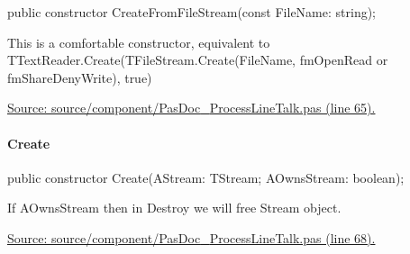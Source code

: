 \documentclass{report}
\newif\ifpdf
\begin{document}
\label{PasDoc_ProcessLineTalk.TTextReader-CreateFromFileStream}
\begin{list}{}{
\setlength{\itemindent}{0cm}
\setlength{\listparindent}{0cm}
\setlength{\leftmargin}{\evensidemargin}
\addtolength{\leftmargin}{\tmplength}
\settowidth{\labelsep}{X}
\addtolength{\leftmargin}{\labelsep}
\setlength{\labelwidth}{\tmplength}
}
\item[\textbf{Declaration}\hfill]
\ifpdf
\begin{flushleft}
\fi
\begin{ttfamily}
public constructor CreateFromFileStream(const FileName: string);\end{ttfamily}

\ifpdf
\end{flushleft}
\fi

\par
\item[\textbf{Description}]
This is a comfortable constructor, equivalent to TTextReader.Create(TFileStream.Create(FileName, fmOpenRead or fmShareDenyWrite), true)\par
\href{https://github.com/pasdoc/pasdoc/blob/master/source/component/PasDoc_ProcessLineTalk.pas#L65}{Source: source/component/PasDoc{\_}ProcessLineTalk.pas (line 65).}

\end{list}
\paragraph*{Create}\hspace*{\fill}

\label{PasDoc_ProcessLineTalk.TTextReader-Create}
\begin{list}{}{
\setlength{\itemindent}{0cm}
\setlength{\listparindent}{0cm}
\setlength{\leftmargin}{\evensidemargin}
\addtolength{\leftmargin}{\tmplength}
\settowidth{\labelsep}{X}
\addtolength{\leftmargin}{\labelsep}
\setlength{\labelwidth}{\tmplength}
}
\item[\textbf{Declaration}\hfill]
\ifpdf
\begin{flushleft}
\fi
\begin{ttfamily}
public constructor Create(AStream: TStream; AOwnsStream: boolean);\end{ttfamily}

\ifpdf
\end{flushleft}
\fi

\par
\item[\textbf{Description}]
If AOwnsStream then in Destroy we will free Stream object.\par
\href{https://github.com/pasdoc/pasdoc/blob/master/source/component/PasDoc_ProcessLineTalk.pas#L68}{Source: source/component/PasDoc{\_}ProcessLineTalk.pas (line 68).}

\end{list}
\end{document}

